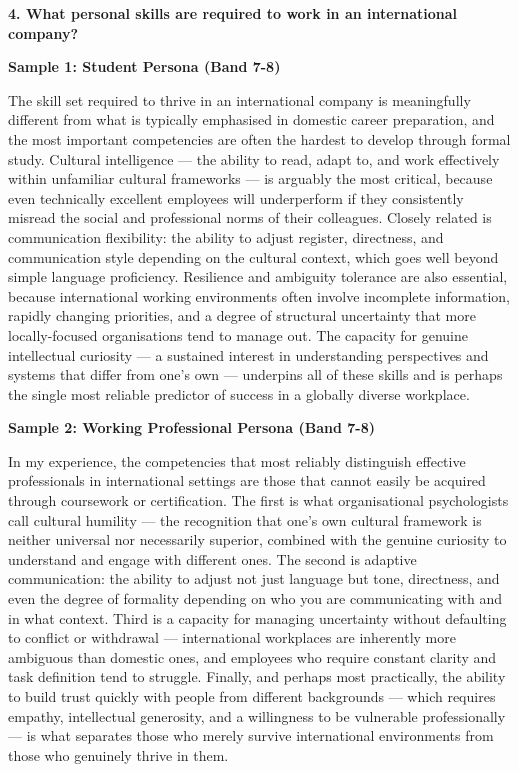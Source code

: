 \separator

\begin{ieltsquestion}
\textbf{4. What personal skills are required to work in an international company?}
\end{ieltsquestion}
\textbf{Sample 1: Student Persona (Band 7-8)}

The skill set required to thrive in an international company is meaningfully different from what is typically emphasised in domestic career preparation, and the most important competencies are often the hardest to develop through formal study. Cultural intelligence — the ability to read, adapt to, and work effectively within unfamiliar cultural frameworks — is arguably the most critical, because even technically excellent employees will underperform if they consistently misread the social and professional norms of their colleagues. Closely related is communication flexibility: the ability to adjust register, directness, and communication style depending on the cultural context, which goes well beyond simple language proficiency. Resilience and ambiguity tolerance are also essential, because international working environments often involve incomplete information, rapidly changing priorities, and a degree of structural uncertainty that more locally-focused organisations tend to manage out. The capacity for genuine intellectual curiosity — a sustained interest in understanding perspectives and systems that differ from one's own — underpins all of these skills and is perhaps the single most reliable predictor of success in a globally diverse workplace.

\textbf{Sample 2: Working Professional Persona (Band 7-8)}

In my experience, the competencies that most reliably distinguish effective professionals in international settings are those that cannot easily be acquired through coursework or certification. The first is what organisational psychologists call cultural humility — the recognition that one's own cultural framework is neither universal nor necessarily superior, combined with the genuine curiosity to understand and engage with different ones. The second is adaptive communication: the ability to adjust not just language but tone, directness, and even the degree of formality depending on who you are communicating with and in what context. Third is a capacity for managing uncertainty without defaulting to conflict or withdrawal — international workplaces are inherently more ambiguous than domestic ones, and employees who require constant clarity and task definition tend to struggle. Finally, and perhaps most practically, the ability to build trust quickly with people from different backgrounds — which requires empathy, intellectual generosity, and a willingness to be vulnerable professionally — is what separates those who merely survive international environments from those who genuinely thrive in them.

